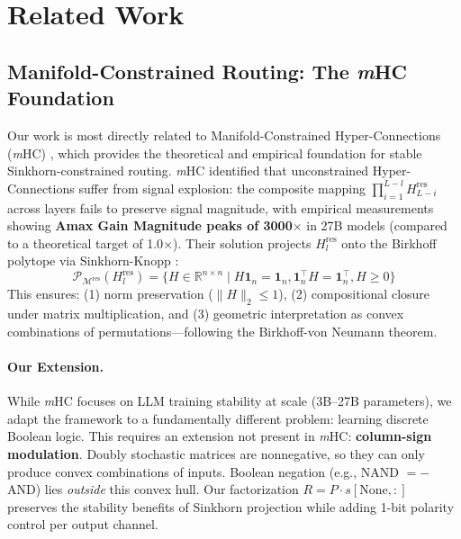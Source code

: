 \documentclass[Royal,times,sageh]{sagej}
\newcommand{\mHC}{\textit{m}HC}
\begin{document}
\section{Related Work}

\subsection{Manifold-Constrained Routing: The \mHC{} Foundation}

Our work is most directly related to Manifold-Constrained Hyper-Connections (\mHC) \cite{xie2024mhc}, which provides the theoretical and empirical foundation for stable Sinkhorn-constrained routing. \mHC{} identified that unconstrained Hyper-Connections \cite{zhu2024hc} suffer from signal explosion: the composite mapping $\prod_{i=1}^{L-l} H^{\text{res}}_{L-i}$ across layers fails to preserve signal magnitude, with empirical measurements showing \textbf{Amax Gain Magnitude peaks of 3000$\times$} in 27B models (compared to a theoretical target of 1.0$\times$). Their solution projects $H^{\text{res}}_l$ onto the Birkhoff polytope via Sinkhorn-Knopp \cite{sinkhorn1967concerning, cuturi2013sinkhorn}:
\begin{equation}
    \mathcal{P}_{\mathcal{M}^{\text{res}}}(H^{\text{res}}_l) = \{H \in \mathbb{R}^{n \times n} \mid H\mathbf{1}_n = \mathbf{1}_n, \mathbf{1}_n^\top H = \mathbf{1}_n^\top, H \geq 0\}
\end{equation}
This ensures: (1) norm preservation ($\|H\|_2 \leq 1$), (2) compositional closure under matrix multiplication, and (3) geometric interpretation as convex combinations of permutations---following the Birkhoff-von Neumann theorem.

\paragraph{Our Extension.} While \mHC{} focuses on LLM training stability at scale (3B--27B parameters), we adapt the framework to a fundamentally different problem: learning discrete Boolean logic. This requires an extension not present in \mHC: \textbf{column-sign modulation}. Doubly stochastic matrices are nonnegative, so they can only produce convex combinations of inputs. Boolean negation (e.g., NAND $= -$AND) lies \textit{outside} this convex hull. Our factorization $R = P \cdot s[\text{None}, :]$ preserves the stability benefits of Sinkhorn projection while adding 1-bit polarity control per output channel.
\end{document}
